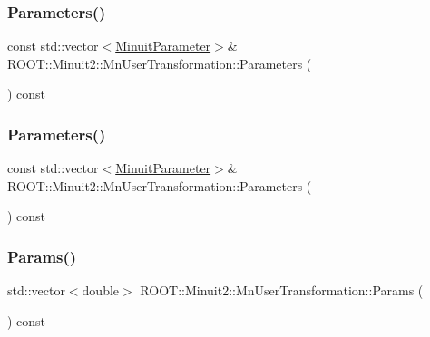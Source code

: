 \subsubsection{\texorpdfstring{Parameters()}{Parameters()}\hspace{0.1cm}{\footnotesize\ttfamily [2/3]}}
{\footnotesize\ttfamily const std\+::vector$<$\mbox{\hyperlink{classROOT_1_1Minuit2_1_1MinuitParameter}{Minuit\+Parameter}}$>$\& R\+O\+O\+T\+::\+Minuit2\+::\+Mn\+User\+Transformation\+::\+Parameters (\begin{DoxyParamCaption}{ }\end{DoxyParamCaption}) const\hspace{0.3cm}{\ttfamily [inline]}}

\mbox{\label{classROOT_1_1Minuit2_1_1MnUserTransformation_a29366e4f3594d0cf3b5d4dc0b1597ad6}} 
\subsubsection{\texorpdfstring{Parameters()}{Parameters()}\hspace{0.1cm}{\footnotesize\ttfamily [3/3]}}
{\footnotesize\ttfamily const std\+::vector$<$\mbox{\hyperlink{classROOT_1_1Minuit2_1_1MinuitParameter}{Minuit\+Parameter}}$>$\& R\+O\+O\+T\+::\+Minuit2\+::\+Mn\+User\+Transformation\+::\+Parameters (\begin{DoxyParamCaption}{ }\end{DoxyParamCaption}) const\hspace{0.3cm}{\ttfamily [inline]}}

\mbox{\label{classROOT_1_1Minuit2_1_1MnUserTransformation_a6b95cc35815242b67b6bcc2a37d5e51a}} 
\subsubsection{\texorpdfstring{Params()}{Params()}\hspace{0.1cm}{\footnotesize\ttfamily [1/3]}}
{\footnotesize\ttfamily std\+::vector$<$double$>$ R\+O\+O\+T\+::\+Minuit2\+::\+Mn\+User\+Transformation\+::\+Params (\begin{DoxyParamCaption}{ }\end{DoxyParamCaption}) const}



